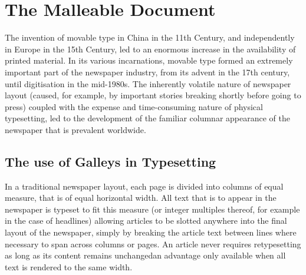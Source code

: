 \cleardoublepage
\chapter{The Malleable Document}\label{ch:malleable}  %




The invention of movable type in China in the 11th Century, and independently in Europe in the 15th Century, led to an enormous increase in the availability of printed material. In its various incarnations, movable type formed an extremely important part of the newspaper industry, from its advent in the 17th century, until digitisation in the mid-1980s. The inherently volatile nature of newspaper layout (caused, for example, by important stories breaking shortly before going to press) coupled with the expense and time-consuming nature of physical typesetting, led to the development of the familiar columnar appearance of the newspaper that is prevalent worldwide.

\section{The use of Galleys in Typesetting}
In a traditional newspaper layout, each page is divided into columns of equal \gls{measure}, that is of equal horizontal width. All text that is to appear in the newspaper is typeset to fit this \gls{measure} (or integer multiples thereof, for example in the case of headlines) allowing articles to be slotted anywhere into the final layout of the newspaper, simply by breaking the article text between lines where necessary to span across columns or pages. An article never requires retypesetting as long as its content remains unchanged\ed{}an advantage only available when all text is rendered to the same width.


